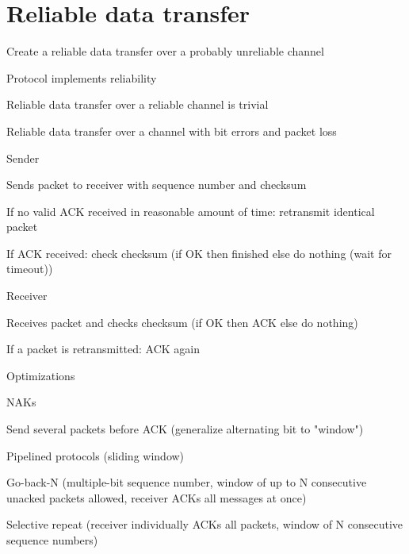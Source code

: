 \section{Reliable data transfer}
\enumstart
	\item Create a reliable data transfer over a probably unreliable channel
	\item Protocol implements reliability
	\item Reliable data transfer over a reliable channel is trivial
	\item Reliable data transfer over a channel with bit errors and packet loss
	\enumstart
		\item Sender
		\enumstart
			\item Sends packet to receiver with sequence number and checksum
			\item If no valid ACK received in reasonable amount of time: retransmit identical packet
			\item If ACK received: check checksum (if OK then finished else do nothing (wait for timeout))
		\enumend
		\item Receiver
		\enumstart
			\item Receives packet and checks checksum (if OK then ACK else do nothing)
			\item If a packet is retransmitted: ACK again
		\enumend
		\item Optimizations
		\enumstart
			\item NAKs
			\item Send several packets before ACK (generalize alternating bit to "window")
			\item Pipelined protocols (sliding window)
			\enumstart
				\item Go-back-N (multiple-bit sequence number, window of up to N consecutive unacked packets allowed, receiver ACKs all messages at once)
				\item Selective repeat (receiver individually ACKs all packets, window of N consecutive sequence numbers)
			\enumend
		\enumend
	\enumend
\enumend
